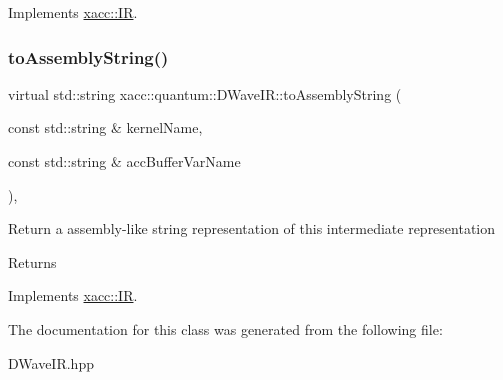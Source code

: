 Implements \hyperlink{a02480_a414b72224d88473ad6190bb88102a3ea}{xacc\+::\+IR}.

\mbox{\label{a01268_ac19ad098d5bbfe769809c10e26ebebc6}} 
\subsubsection{\texorpdfstring{to\+Assembly\+String()}{toAssemblyString()}}
{\footnotesize\ttfamily virtual std\+::string xacc\+::quantum\+::\+D\+Wave\+I\+R\+::to\+Assembly\+String (\begin{DoxyParamCaption}\item[{const std\+::string \&}]{kernel\+Name,  }\item[{const std\+::string \&}]{acc\+Buffer\+Var\+Name }\end{DoxyParamCaption})\hspace{0.3cm}{\ttfamily [inline]}, {\ttfamily [virtual]}}

Return a assembly-\/like string representation of this intermediate representation \begin{DoxyReturn}{Returns}

\end{DoxyReturn}


Implements \hyperlink{a02480_a8356cdff1919b88eabeb84fd7450cdb6}{xacc\+::\+IR}.



The documentation for this class was generated from the following file\+:\begin{DoxyCompactItemize}
\item 
D\+Wave\+I\+R.\+hpp\end{DoxyCompactItemize}
